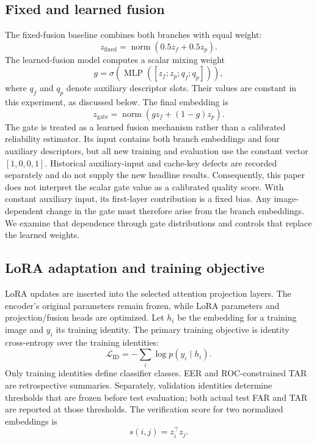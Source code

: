 \documentclass[10pt,journal,compsoc]{IEEEtran}
\begin{document}
\subsection{Fixed and learned fusion}
The fixed-fusion baseline combines both branches with equal weight:
\begin{equation}
 z_{\mathrm{fixed}}=\operatorname{norm}(0.5z_f+0.5z_p).
\end{equation}
The learned-fusion model computes a scalar mixing weight
\begin{equation}
 g=\sigma\left(\operatorname{MLP}([z_f;z_p;q_f;q_p])\right),
\end{equation}
where $q_f$ and $q_p$ denote auxiliary descriptor slots. Their values are constant in this experiment, as discussed below. The final embedding is
\begin{equation}
 z_{\mathrm{gate}}=\operatorname{norm}(gz_f+(1-g)z_p).
\end{equation}
The gate is treated as a learned fusion mechanism rather than a calibrated reliability estimator. Its input contains both branch embeddings and four auxiliary descriptors, but all new training and evaluation use the constant vector $[1,0,0,1]$. Historical auxiliary-input and cache-key defects are recorded separately and do not supply the new headline results. Consequently, this paper does not interpret the scalar gate value as a calibrated quality score. With constant auxiliary input, its first-layer contribution is a fixed bias. Any image-dependent change in the gate must therefore arise from the branch embeddings. We examine that dependence through gate distributions and controls that replace the learned weights.

\subsection{LoRA adaptation and training objective}
LoRA updates are inserted into the selected attention projection layers. The encoder's original parameters remain frozen, while LoRA parameters and projection/fusion heads are optimized. Let $h_i$ be the embedding for a training image and $y_i$ its training identity. The primary training objective is identity cross-entropy over the training identities:
\begin{equation}
 \mathcal{L}_{\mathrm{ID}}=-\sum_i\log p(y_i\mid h_i).
\end{equation}
Only training identities define classifier classes. EER and ROC-constrained TAR are retrospective summaries. Separately, validation identities determine thresholds that are frozen before test evaluation; both actual test FAR and TAR are reported at those thresholds. The verification score for two normalized embeddings is
\begin{equation}
 s(i,j)=z_i^\top z_j.
\end{equation}
\end{document}
